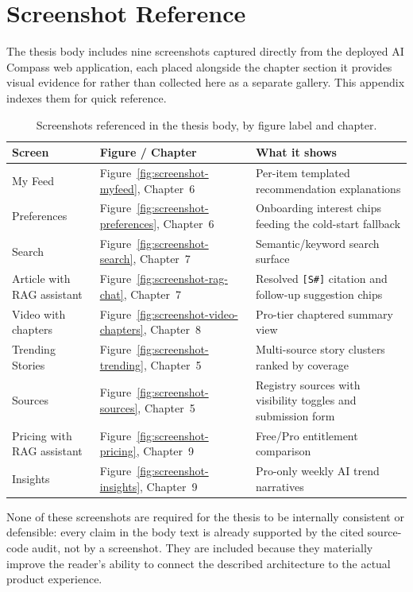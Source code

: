 \chapter{Screenshot Reference}
\label{app:screenshots}

The thesis body includes nine screenshots captured directly from the deployed AI Compass web application, each placed alongside the chapter section it provides visual evidence for rather than collected here as a separate gallery. This appendix indexes them for quick reference.

\begin{table}[htbp]
\centering
\caption{Screenshots referenced in the thesis body, by figure label and chapter.}
\label{tab:screenshot-index}
\begin{tabular}{|p{4.2cm}|p{3.6cm}|p{5.5cm}|}
\hline
\textbf{Screen} & \textbf{Figure / Chapter} & \textbf{What it shows} \\
\hline
My Feed & Figure~\ref{fig:screenshot-myfeed}, Chapter~6 & Per-item templated recommendation explanations \\
\hline
Preferences & Figure~\ref{fig:screenshot-preferences}, Chapter~6 & Onboarding interest chips feeding the cold-start fallback \\
\hline
Search & Figure~\ref{fig:screenshot-search}, Chapter~7 & Semantic/keyword search surface \\
\hline
Article with RAG assistant & Figure~\ref{fig:screenshot-rag-chat}, Chapter~7 & Resolved \texttt{[S\#]} citation and follow-up suggestion chips \\
\hline
Video with chapters & Figure~\ref{fig:screenshot-video-chapters}, Chapter~8 & Pro-tier chaptered summary view \\
\hline
Trending Stories & Figure~\ref{fig:screenshot-trending}, Chapter~5 & Multi-source story clusters ranked by coverage \\
\hline
Sources & Figure~\ref{fig:screenshot-sources}, Chapter~5 & Registry sources with visibility toggles and submission form \\
\hline
Pricing with RAG assistant & Figure~\ref{fig:screenshot-pricing}, Chapter~9 & Free/Pro entitlement comparison \\
\hline
Insights & Figure~\ref{fig:screenshot-insights}, Chapter~9 & Pro-only weekly AI trend narratives \\
\hline
\end{tabular}
\end{table}

None of these screenshots are required for the thesis to be internally consistent or defensible: every claim in the body text is already supported by the cited source-code audit, not by a screenshot. They are included because they materially improve the reader's ability to connect the described architecture to the actual product experience.

